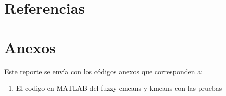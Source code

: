 \documentclass[11pt, letterpaper]{article}
\begin{document}
\newpage

\section{Referencias}


\newpage

\section{Anexos}

Este reporte se envía con los códigos anexos que corresponden a:

\begin{enumerate}
	\item El codigo en MATLAB del fuzzy cmeans  y kmeans con las pruebas

\end{enumerate}
\end{document}
